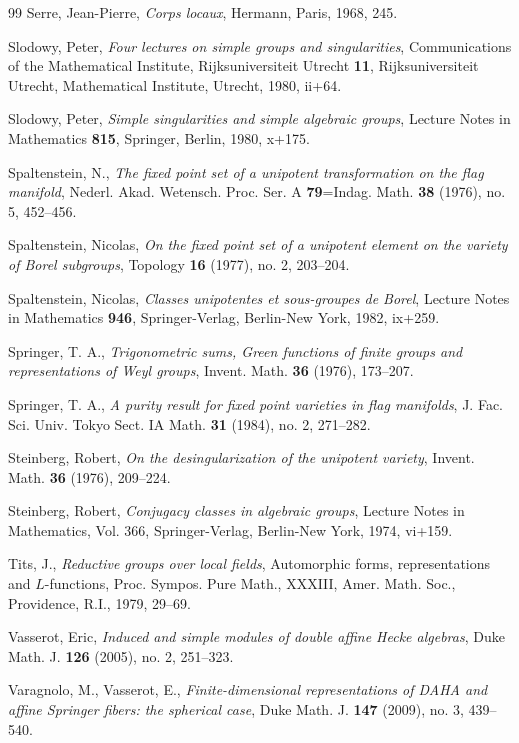 \begin{thebibliography}{99}
 Serre, Jean-Pierre, \emph{Corps locaux}, Hermann, Paris, 1968, 245.

 Slodowy, Peter, \emph{Four lectures on simple groups and singularities}, Communications of the Mathematical Institute, Rijksuniversiteit Utrecht \textbf{11}, Rijksuniversiteit Utrecht, Mathematical Institute, Utrecht, 1980, ii+64.

 Slodowy, Peter, \emph{Simple singularities and simple algebraic groups}, Lecture Notes in Mathematics \textbf{815}, Springer, Berlin, 1980, x+175.

 Spaltenstein, N., \emph{The fixed point set of a unipotent transformation on the flag manifold}, Nederl. Akad. Wetensch. Proc. Ser. A {\bf 79}=Indag. Math. \textbf{38} (1976), no. 5, 452--456.

 Spaltenstein, Nicolas, \emph{On the fixed point set of a unipotent element on the variety of Borel subgroups}, Topology \textbf{16} (1977), no. 2, 203--204.

 Spaltenstein, Nicolas, \emph{Classes unipotentes et sous-groupes de Borel}, Lecture Notes in Mathematics \textbf{946}, Springer-Verlag, Berlin-New York, 1982, ix+259.

 Springer, T. A., \emph{Trigonometric sums, Green functions of finite groups and representations of Weyl groups}, Invent. Math. \textbf{36} (1976), 173--207.

 Springer, T. A., \emph{A purity result for fixed point varieties in flag manifolds}, J. Fac. Sci. Univ. Tokyo Sect. IA Math. \textbf{31} (1984), no. 2, 271--282.

 Steinberg, Robert, \emph{On the desingularization of the unipotent variety}, Invent. Math. \textbf{36} (1976), 209--224.

 Steinberg, Robert, \emph{Conjugacy classes in algebraic groups}, Lecture Notes in Mathematics, Vol. 366, Springer-Verlag, Berlin-New York, 1974, vi+159.

 Tits, J., \emph{Reductive groups over local fields}, Automorphic forms, representations and $L$-functions, Proc. Sympos. Pure Math., XXXIII, Amer. Math. Soc., Providence, R.I., 1979, 29--69.

 Vasserot, Eric, \emph{Induced and simple modules of double affine Hecke algebras}, Duke Math. J. \textbf{126} (2005), no. 2, 251--323.

 Varagnolo, M., Vasserot, E., \emph{Finite-dimensional representations of DAHA and affine Springer fibers: the spherical case}, Duke Math. J. \textbf{147} (2009), no. 3, 439--540.


\end{thebibliography}
